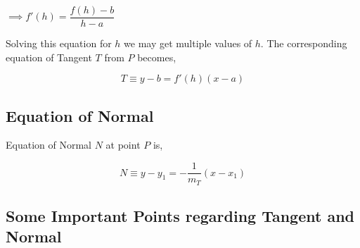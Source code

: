 \documentclass{article}
\begin{document}
$\implies f'(h)=\dfrac{f(h)-b}{h-a}$

Solving this equation for $h$ we may get multiple values of $h$. The corresponding equation of Tangent $T$ from $P$ becomes,

$$T \equiv y-b=f'(h) \left(x-a\right)$$

\subsection{Equation of Normal}
Equation of Normal $N$ at point $P$ is,

$$N \equiv y-y_{1}=-\dfrac{1}{m_{T}}\left(x-x_{1}\right)$$

\subsection{Some Important Points regarding Tangent and Normal}
\end{document}
